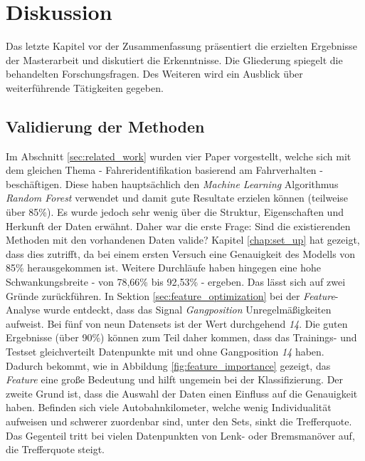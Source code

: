 %
%
%
%
%


\chapter{Diskussion}
\label{chap:discussion}

Das letzte Kapitel vor der Zusammenfassung präsentiert die erzielten Ergebnisse der Masterarbeit und diskutiert die Erkenntnisse. Die Gliederung spiegelt die behandelten Forschungsfragen. Des Weiteren wird ein Ausblick über weiterführende Tätigkeiten gegeben.

\section{Validierung der Methoden}

Im Abschnitt \ref{sec:related_work} wurden vier Paper vorgestellt, welche sich mit dem gleichen Thema - Fahreridentifikation basierend am Fahrverhalten - beschäftigen. Diese haben hauptsächlich den \textit{Machine Learning} Algorithmus \textit{Random Forest} verwendet und damit gute Resultate erzielen können (teilweise über 85\%). Es wurde jedoch sehr wenig über die Struktur, Eigenschaften und Herkunft der Daten erwähnt. Daher war die erste Frage: Sind die existierenden Methoden mit den vorhandenen Daten valide? Kapitel \ref{chap:set_up} hat gezeigt, dass dies zutrifft, da bei einem ersten Versuch eine Genauigkeit des Modells von 85\% herausgekommen ist. Weitere Durchläufe haben hingegen eine hohe Schwankungsbreite - von 78,66\% bis 92,53\% - ergeben. Das lässt sich auf zwei Gründe zurückführen. In Sektion \ref{sec:feature_optimization} bei der \textit{Feature}-Analyse wurde entdeckt, dass das Signal \textit{Gangposition} Unregelmäßigkeiten aufweist. Bei fünf von neun Datensets ist der Wert durchgehend \textit{14}. Die guten Ergebnisse (über 90\%) können zum Teil daher kommen, dass das Trainings- und Testset gleichverteilt Datenpunkte mit und ohne Gangposition \textit{14} haben. Dadurch bekommt, wie in Abbildung \ref{fig:feature_importance} gezeigt, das \textit{Feature} eine große Bedeutung und hilft ungemein bei der Klassifizierung. Der zweite Grund ist, dass die Auswahl der Daten einen Einfluss auf die Genauigkeit haben. Befinden sich viele Autobahnkilometer, welche wenig Individualität aufweisen und schwerer zuordenbar sind, unter den Sets, sinkt die Trefferquote. Das Gegenteil tritt bei vielen Datenpunkten von Lenk- oder Bremsmanöver auf, die Trefferquote steigt.

